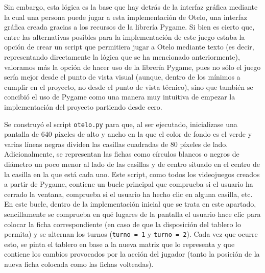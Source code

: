 \documentclass[conference]{IEEEtran}
\begin{document}
Sin embargo, esta lógica es la base que hay detrás de la interfaz gráfica mediante la cual una persona puede jugar a esta implementación de Otelo, una interfaz gráfica creada gracias a los recursos de la librería Pygame. Si bien es cierto que, entre las alternativas posibles para la implementación de este juego estaba la opción de crear un script que permitiera jugar a Otelo mediante texto (es decir, representando directamente la lógica que se ha mencionado anteriormente), valoramos más la opción de hacer uso de la librería Pygame, pues no sólo el juego sería mejor desde el punto de vista visual (aunque, dentro de los mínimos a cumplir en el proyecto, no desde el punto de vista técnico), sino que también se concibió el uso de Pygame como una manera muy intuitiva de empezar la implementación del proyecto partiendo desde cero.

Se construyó el script \texttt{otelo.py} para que, al ser ejecutado, inicializase una pantalla de 640 píxeles de alto y ancho en la que el color de fondo es el verde y varias líneas negras dividen las casillas cuadradas de 80 píxeles de lado. Adicionalmente, se representan las fichas como círculos blancos o negros de diámetro un poco menor al lado de las casillas y de centro situado en el centro de la casilla en la que está cada uno. Este script, como todos los videojuegos creados a partir de Pygame, contiene un bucle principal que comprueba si el usuario ha cerrado la ventana, comprueba si el usuario ha hecho clic en alguna casilla, etc. En este bucle, dentro de la implementación inicial que se trata en este apartado, sencillamente se comprueba en qué lugares de la pantalla el usuario hace clic para colocar la ficha correspondiente (en caso de que la disposición del tablero lo permita) y se alternan los turnos (\texttt{turno = 1} y \texttt{turno = 2}). Cada vez que ocurre esto, se pinta el tablero en base a la nueva matriz que lo representa y que contiene los cambios provocados por la acción del jugador (tanto la posición de la nueva ficha colocada como las fichas volteadas).
\end{document}
